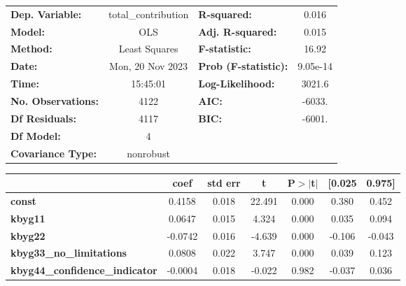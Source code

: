 \begin{center}
\begin{tabular}{lclc}
\toprule
\textbf{Dep. Variable:}                & total\_contribution & \textbf{  R-squared:         } &     0.016   \\
\textbf{Model:}                        &         OLS         & \textbf{  Adj. R-squared:    } &     0.015   \\
\textbf{Method:}                       &    Least Squares    & \textbf{  F-statistic:       } &     16.92   \\
\textbf{Date:}                         &   Mon, 20 Nov 2023  & \textbf{  Prob (F-statistic):} &  9.05e-14   \\
\textbf{Time:}                         &       15:45:01      & \textbf{  Log-Likelihood:    } &    3021.6   \\
\textbf{No. Observations:}             &          4122       & \textbf{  AIC:               } &    -6033.   \\
\textbf{Df Residuals:}                 &          4117       & \textbf{  BIC:               } &    -6001.   \\
\textbf{Df Model:}                     &             4       & \textbf{                     } &             \\
\textbf{Covariance Type:}              &      nonrobust      & \textbf{                     } &             \\
\bottomrule
\end{tabular}
\begin{tabular}{lcccccc}
                                       & \textbf{coef} & \textbf{std err} & \textbf{t} & \textbf{P$> |$t$|$} & \textbf{[0.025} & \textbf{0.975]}  \\
\midrule
\textbf{const}                         &       0.4158  &        0.018     &    22.491  &         0.000        &        0.380    &        0.452     \\
\textbf{kbyg11}                        &       0.0647  &        0.015     &     4.324  &         0.000        &        0.035    &        0.094     \\
\textbf{kbyg22}                        &      -0.0742  &        0.016     &    -4.639  &         0.000        &       -0.106    &       -0.043     \\
\textbf{kbyg33\_no\_limitations}       &       0.0808  &        0.022     &     3.747  &         0.000        &        0.039    &        0.123     \\
\textbf{kbyg44\_confidence\_indicator} &      -0.0004  &        0.018     &    -0.022  &         0.982        &       -0.037    &        0.036     \\

\end{tabular}
\end{center}
